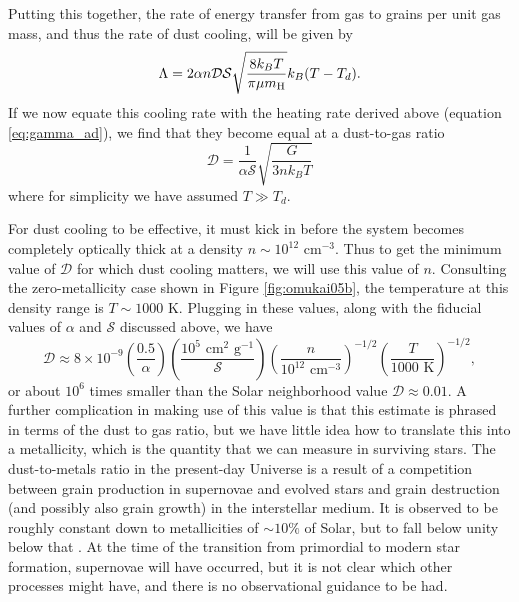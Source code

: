 Putting this together, the rate of energy transfer from gas to grains per unit gas mass, and thus the rate of dust cooling, will be given by
\begin{equation}
\Lambda = 2 \alpha n \mathcal{D} \mathcal{S} \sqrt{\frac{8 k_B T}{\pi \mu m_{\rm H}}} k_B (T-T_d).
\end{equation}
If we now equate this cooling rate with the heating rate derived above (equation \ref{eq:gamma_ad}), we find that they become equal at a dust-to-gas ratio
\begin{equation}
\mathcal{D} = \frac{1}{\alpha \mathcal{S}} \sqrt{\frac{G}{3 n k_B T}}
\end{equation}
where for simplicity we have assumed $T \gg T_d$.

For dust cooling to be effective, it must kick in before the system becomes completely optically thick at a density $n\sim 10^{12}$ cm$^{-3}$. Thus to get the minimum value of $\mathcal{D}$ for which dust cooling matters, we will use this value of $n$. Consulting the zero-metallicity case shown in Figure \ref{fig:omukai05b}, the temperature at this density range is $T\sim 1000$ K. Plugging in these values, along with the fiducial values of $\alpha$ and $\mathcal{S}$ discussed above, we have
\begin{equation}
\mathcal{D} \approx 8\times 10^{-9}\left(\frac{0.5}{\alpha}\right)
\left(\frac{10^5\mbox{ cm}^2\mbox{ g}^{-1}}{\mathcal{S}}\right)
\left(\frac{n}{10^{12}\mbox{ cm}^{-3}}\right)^{-1/2} \left(\frac{T}{1000\mbox{ K}}\right)^{-1/2},
\end{equation}
or about $10^6$ times smaller than the Solar neighborhood value $\mathcal{D} \approx 0.01$. A further complication in making use of this value is that this estimate is phrased in terms of the dust to gas ratio, but we have little idea how to translate this into a metallicity, which is the quantity that we can measure in surviving stars. The dust-to-metals ratio in the present-day Universe is a result of a competition between grain production in supernovae and evolved stars and grain destruction (and possibly also grain growth) in the interstellar medium. It is observed to be roughly constant down to metallicities of $\sim 10\%$ of Solar, but to fall below unity below that \citep{remy-ruyer14a}. At the time of the transition from primordial to modern star formation, supernovae will have occurred, but it is not clear which other processes might have, and there is no observational guidance to be had.


